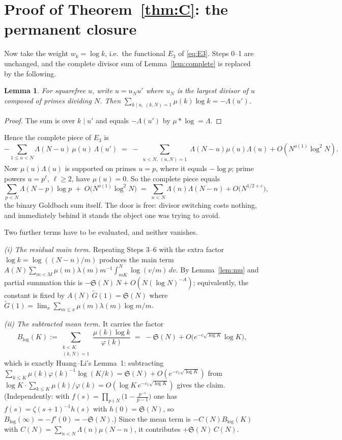 \documentclass[11pt,a4paper]{article}
\theoremstyle{plain}
\newtheorem{lemma}[theorem]{Lemma}
\theoremstyle{definition}
\renewcommand{\SS}{\mathfrak{S}}
\begin{document}
\section{Proof of Theorem~\ref{thm:C}: the permanent closure}\label{sec:C}

Now take the weight $w_k=\log k$, i.e.\ the functional $E_3$ of
\eqref{eq:E3}. Steps 0--1 are unchanged, and the complete divisor sum of
Lemma~\ref{lem:complete} is replaced by the following.

\begin{lemma}\label{lem:completelog}
For squarefree $u$, write $u=u_N u'$ where $u_N$ is the largest divisor
of $u$ composed of primes dividing $N$. Then
$\sum_{k\mid u,\ (k,N)=1}\mu(k)\log k=-\Lambda(u')$.
\end{lemma}

\begin{proof}
The sum is over $k\mid u'$ and equals $-\Lambda(u')$ by
$\mu*\log=\Lambda$.
\end{proof}

Hence the complete piece of $E_3$ is
\[
  -\sum_{1\le u<N}\Lambda(N-u)\,\mu(u)\,\Lambda(u')
  \;=\; -\sum_{\substack{u<N,\ (u,N)=1}}\Lambda(N-u)\mu(u)\Lambda(u)
        + O(N^{o(1)}\log^2 N).
\]
Now $\mu(u)\Lambda(u)$ is supported on primes $u=p$, where it equals
$-\log p$; prime powers $u=p^\ell$, $\ell\ge2$, have $\mu(u)=0$. So the
complete piece equals
\begin{equation}\label{eq:goldbachback}
  \sum_{p<N}\Lambda(N-p)\log p \;+\;O\bigl(N^{o(1)}\log^2N\bigr)
  \;=\;\sum_{n<N}\Lambda(n)\Lambda(N-n)+O\bigl(N^{1/2+\varepsilon}\bigr),
\end{equation}
the binary Goldbach sum itself. The door is free: divisor switching
costs nothing, and immediately behind it stands the object one was
trying to avoid.

Two further terms have to be evaluated, and neither vanishes.

\emph{(i) The residual main term.} Repeating Steps 3--6 with the extra
factor $\log k=\log((N-n)/m)$ produces the main term
$A(N)\sum_{m<M}\mu(m)\lambda(m)m^{-1}\int_{mK}^{N}\log(v/m)\,dv$. By
Lemma~\ref{lem:mu} and partial summation this is
$-\SS(N)\,N+O(N(\log N)^{-A})$; equivalently, the constant is fixed by
$A(N)\,\widetilde G(1)=\SS(N)$ where
$\widetilde G(1)=\lim_x\sum_{m\le x}\mu(m)\lambda(m)\log m/m$.

\emph{(ii) The subtracted mean term.} It carries the factor
\[
  B_{\log}(K):=\sum_{\substack{k<K\\ (k,N)=1}}\frac{\mu(k)\log k}{\varphi(k)}
  \;=\;-\SS(N)+O\bigl(e^{-c\sqrt{\log K}}\log K\bigr),
\]
which is exactly Huang--Li's Lemma~1: subtracting
$\sum_{k\le K}\mu(k)\varphi(k)^{-1}\log(K/k)=\SS(N)+O(e^{-c_1\sqrt{\log K}})$
from $\log K\cdot\sum_{k\le K}\mu(k)/\varphi(k)=O(\log K\,e^{-c_1\sqrt{\log K}})$
gives the claim. (Independently: with
$f(s)=\prod_{p\nmid N}\bigl(1-\frac{p^{-s}}{p-1}\bigr)$ one has
$f(s)=\zeta(s+1)^{-1}h(s)$ with $h(0)=\SS(N)$, so
$B_{\log}(\infty)=-f'(0)=-\SS(N)$.) Since the mean term is
$-C(N)B_{\log}(K)$ with $C(N)=\sum_{n<N}\Lambda(n)\mu(N-n)$, it
contributes $+\SS(N)\,C(N)$.
\end{document}
